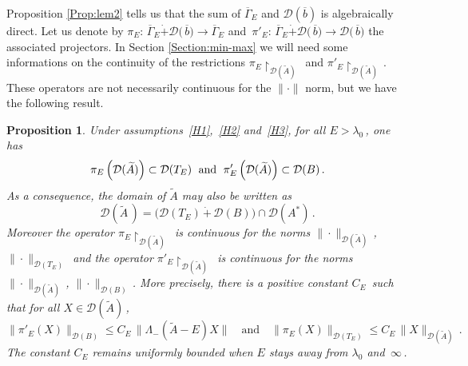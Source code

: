 \documentclass[12pt,reqno]{amsart}
\newtheorem{proposition}[theorem]{Proposition}
\newcommand{\be}[1]{\begin{equation}\label{#1}}
\newcommand{\ee}{\end{equation}}
\renewcommand{\(}{\left(}
\renewcommand{\)}{\right)}
\begin{document}
Proposition \ref{Prop:lem2} tells us that the sum of $\overline{\Gamma}_E$ and $\mathcal D(\overline{b})$ is algebraically direct. Let us denote by $\pi_E:\,\overline{\Gamma}_E\dot{+} \mathcal D\big(\,\overline{b}\big)\to\overline{\Gamma}_E$ and $\,\pi'_E:\,\overline{\Gamma}_E\dot{+} \mathcal D\big(\,\overline{b}\big)\to\mathcal D\big(\,\overline{b}\big)$ the associated projectors. In Section \ref{Section:min-max} we will need some informations on the continuity of the restrictions $\pi_E\!\upharpoonright_{\mathcal D(\tilde A)}\,$ and $\pi'_E\!\upharpoonright_{\mathcal D(\tilde A)}\,$. These operators are not necessarily continuous for the $\|\cdot\|$ norm, but we have the following result.
\begin{proposition}\label{continuity}
Under assumptions~\eqref{H1},~\eqref{H2} and~\eqref{H3}, for all $E>\lambda_0\,$, one has
\[\pi_E\left(\mathcal D(\widetilde A)\right)\subset \mathcal D(T_E)\;\hbox{ and }\;\pi'_E\left(\mathcal D(\widetilde A)\right)\subset \mathcal D(B)\,.\]
As a consequence, the domain of $\widetilde A$ may also be written as
\be{dom bis}
\mathcal D\(\widetilde A\,\)= \big(\mathcal D\(T_E\) \,\dot{+}\, \mathcal D(B)\big)\cap \mathcal D\(A^*\)\,.
\ee
Moreover the operator $\pi_E\!\upharpoonright_{\mathcal D(\tilde A)}\,$ is continuous for the norms $\| \cdot\|_{\mathcal D(\widetilde A)}\,$, $\|\cdot\|_{\mathcal D(T_E)}\,$ and the operator $\pi'_E\!\upharpoonright_{\mathcal D(\tilde A)}\,$ is continuous for the norms $\| \cdot\|_{\mathcal D(\widetilde A)}\,$, $\| \cdot\|_{\mathcal D(B)}\,$. More precisely, there is a positive constant $C_E\,$ such that for all $X\in \mathcal D(\widetilde A)\,$,
\[
\| \pi'_E (X)\|_{\mathcal D(B)}\le C_E\,\| \Lambda_-(\widetilde A -E)X\|\quad\mbox{and}\quad\| \pi_E (X)\|_{\mathcal D(T_E)}\le C_E\,\| X \|_{\mathcal D(\widetilde A)} \,.
\]
The constant $C_E$ remains uniformly bounded when $E$ stays away from $\lambda_0$ and $\,\infty\,$.
\end{proposition}
\end{document}
